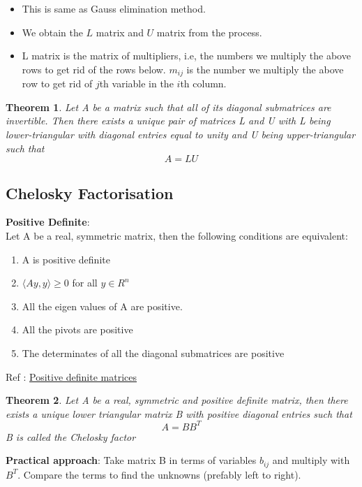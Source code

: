 \documentclass{article}
\newtheorem*{theorem}{Theorem}
\begin{document}
		\begin{itemize}
			\item This is same as Gauss elimination method.
			\item We obtain the $L$ matrix and $U$ matrix from the process. 
			\item L matrix is the matrix of multipliers, i.e, the numbers we multiply the above rows to get rid of the rows below. $m_{ij}$ is the number we multiply the above row to get rid of $j$th variable in the $i$th column.
		\end{itemize}

		\begin{theorem}
		Let A be a matrix such that all of its diagonal submatrices are invertible. Then there {exists} a unique pair of matrices L and U with L being lower-triangular with diagonal entries equal to unity and U being upper-triangular such that
		\[A= LU\]
		\end{theorem}

	\subsection{Chelosky Factorisation}
		\textbf{Positive Definite}:\\
		Let A be a real, symmetric matrix, then the following conditions are equivalent:
		\begin{enumerate}
		\item A is positive definite
		\item $\langle Ay, y \rangle \geq 0$  for all $y\in R^n$ 
		\item All the eigen values of A are positive.
		\item All the pivots are positive
		\item The determinates of all the diagonal submatrices are positive
		\end{enumerate}
		Ref : \href{http://slpl.cse.nsysu.edu.tw/chiaping/la/pdm.pdf}{Positive definite matrices}

		\begin{theorem}
			Let A be a \emph{real, symmetric and positive definite matrix}, then there exists a unique lower triangular matrix B with positive diagonal entries such that 
			\[A = BB^T\]
			B is called the Chelosky factor
		\end{theorem}

		\textbf{Practical approach}: Take matrix B in terms of variables $b_{ij}$ and multiply with $B^T$. Compare the terms to find the unknowns (prefably left to right).
\end{document}
